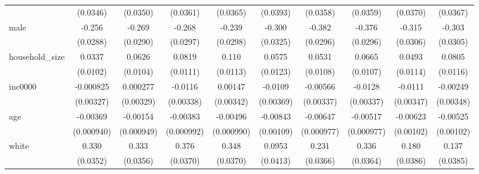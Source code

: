 {\begin{tabular}{l*{9}{c}}
            &    (0.0346)         &    (0.0350)         &    (0.0361)         &    (0.0365)         &    (0.0393)         &    (0.0358)         &    (0.0359)         &    (0.0370)         &    (0.0367)         \\
[1em]
male        &      -0.256\sym{***}&      -0.269\sym{***}&      -0.268\sym{***}&      -0.239\sym{***}&      -0.300\sym{***}&      -0.382\sym{***}&      -0.376\sym{***}&      -0.315\sym{***}&      -0.303\sym{***}\\
            &    (0.0288)         &    (0.0290)         &    (0.0297)         &    (0.0298)         &    (0.0325)         &    (0.0296)         &    (0.0296)         &    (0.0306)         &    (0.0305)         \\
[1em]
household\_size&      0.0337\sym{***}&      0.0626\sym{***}&      0.0819\sym{***}&       0.110\sym{***}&      0.0575\sym{***}&      0.0531\sym{***}&      0.0665\sym{***}&      0.0493\sym{***}&      0.0805\sym{***}\\
            &    (0.0102)         &    (0.0104)         &    (0.0111)         &    (0.0113)         &    (0.0123)         &    (0.0108)         &    (0.0107)         &    (0.0114)         &    (0.0116)         \\
[1em]
inc0000     &   -0.000825         &    0.000277         &     -0.0116\sym{***}&     0.00147         &     -0.0109\sym{***}&    -0.00566\sym{*}  &     -0.0128\sym{***}&     -0.0111\sym{***}&    -0.00249         \\
            &   (0.00327)         &   (0.00329)         &   (0.00338)         &   (0.00342)         &   (0.00369)         &   (0.00337)         &   (0.00337)         &   (0.00347)         &   (0.00348)         \\
[1em]
age         &    -0.00369\sym{***}&    -0.00154         &    -0.00383\sym{***}&    -0.00496\sym{***}&    -0.00843\sym{***}&    -0.00647\sym{***}&    -0.00517\sym{***}&    -0.00623\sym{***}&    -0.00525\sym{***}\\
            &  (0.000940)         &  (0.000949)         &  (0.000992)         &  (0.000990)         &   (0.00109)         &  (0.000977)         &  (0.000977)         &   (0.00102)         &   (0.00102)         \\
[1em]
white       &       0.330\sym{***}&       0.333\sym{***}&       0.376\sym{***}&       0.348\sym{***}&      0.0953\sym{**} &       0.231\sym{***}&       0.336\sym{***}&       0.180\sym{***}&       0.137\sym{***}\\
            &    (0.0352)         &    (0.0356)         &    (0.0370)         &    (0.0370)         &    (0.0413)         &    (0.0366)         &    (0.0364)         &    (0.0386)         &    (0.0385)         \\

\end{tabular}}
